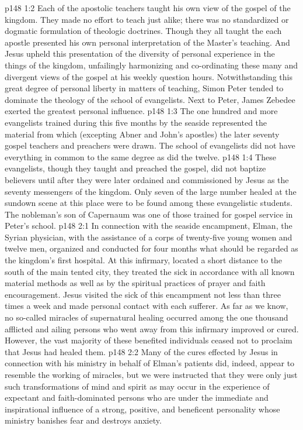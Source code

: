 \vs p148 1:2 Each of the apostolic teachers taught his own view of the gospel of the kingdom. They made no effort to teach just alike; there was no standardized or dogmatic formulation of theologic doctrines. Though they all taught the  each apostle presented his own personal interpretation of the Master’s teaching. And Jesus upheld this presentation of the diversity of personal experience in the things of the kingdom, unfailingly harmonizing and co\hyp{}ordinating these many and divergent views of the gospel at his weekly question hours. Notwithstanding this great degree of personal liberty in matters of teaching, Simon Peter tended to dominate the theology of the school of evangelists. Next to Peter, James Zebedee exerted the greatest personal influence.
\vs p148 1:3 The one hundred and more evangelists trained during this five months by the seaside represented the material from which (excepting Abner and John’s apostles) the later seventy gospel teachers and preachers were drawn. The school of evangelists did not have everything in common to the same degree as did the twelve.
\vs p148 1:4 These evangelists, though they taught and preached the gospel, did not baptize believers until after they were later ordained and commissioned by Jesus as the seventy messengers of the kingdom. Only seven of the large number healed at the sundown scene at this place were to be found among these evangelistic students. The nobleman’s son of Capernaum was one of those trained for gospel service in Peter’s school.
\vs p148 2:1 In connection with the seaside encampment, Elman, the Syrian physician, with the assistance of a corps of twenty\hyp{}five young women and twelve men, organized and conducted for four months what should be regarded as the kingdom’s first hospital. At this infirmary, located a short distance to the south of the main tented city, they treated the sick in accordance with all known material methods as well as by the spiritual practices of prayer and faith encouragement. Jesus visited the sick of this encampment not less than three times a week and made personal contact with each sufferer. As far as we know, no so\hyp{}called miracles of supernatural healing occurred among the one thousand afflicted and ailing persons who went away from this infirmary improved or cured. However, the vast majority of these benefited individuals ceased not to proclaim that Jesus had healed them.\plusone
\vs p148 2:2 Many of the cures effected by Jesus in connection with his ministry in behalf of Elman’s patients did, indeed, appear to resemble the working of miracles, but we were instructed that they were only just such transformations of mind and spirit as may occur in the experience of expectant and faith\hyp{}dominated persons who are under the immediate and inspirational influence of a strong, positive, and beneficent personality whose ministry banishes fear and destroys anxiety.
